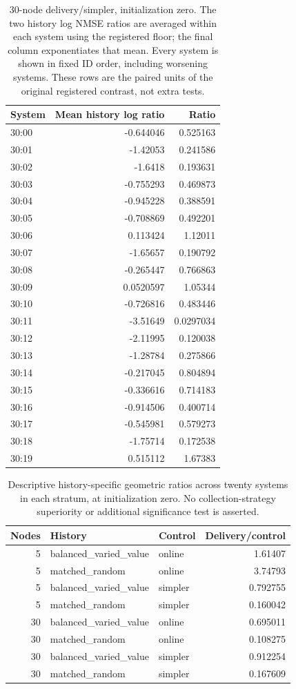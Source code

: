 \begin{table}[ht]
\centering\scriptsize
\begin{tabular}{lrr}
\toprule
System & Mean history log ratio & Ratio\\
\midrule
30:00 & -0.644046 & 0.525163\\
30:01 & -1.42053 & 0.241586\\
30:02 & -1.6418 & 0.193631\\
30:03 & -0.755293 & 0.469873\\
30:04 & -0.945228 & 0.388591\\
30:05 & -0.708869 & 0.492201\\
30:06 & 0.113424 & 1.12011\\
30:07 & -1.65657 & 0.190792\\
30:08 & -0.265447 & 0.766863\\
30:09 & 0.0520597 & 1.05344\\
30:10 & -0.726816 & 0.483446\\
30:11 & -3.51649 & 0.0297034\\
30:12 & -2.11995 & 0.120038\\
30:13 & -1.28784 & 0.275866\\
30:14 & -0.217045 & 0.804894\\
30:15 & -0.336616 & 0.714183\\
30:16 & -0.914506 & 0.400714\\
30:17 & -0.545981 & 0.579273\\
30:18 & -1.75714 & 0.172538\\
30:19 & 0.515112 & 1.67383\\
\bottomrule
\end{tabular}
\caption{30-node delivery/simpler, initialization zero. The two history log NMSE ratios are averaged within each system using the registered floor; the final column exponentiates that mean. Every system is shown in fixed ID order, including worsening systems. These rows are the paired units of the original registered contrast, not extra tests.}
\end{table}
\begin{table}[ht]
\centering\small
\begin{tabular}{rllr}
\toprule
Nodes & History & Control & Delivery/control\\
\midrule
5 & balanced\_varied\_value & online & 1.61407\\
5 & matched\_random & online & 3.74793\\
5 & balanced\_varied\_value & simpler & 0.792755\\
5 & matched\_random & simpler & 0.160042\\
30 & balanced\_varied\_value & online & 0.695011\\
30 & matched\_random & online & 0.108275\\
30 & balanced\_varied\_value & simpler & 0.912254\\
30 & matched\_random & simpler & 0.167609\\
\bottomrule
\end{tabular}
\caption{Descriptive history-specific geometric ratios across twenty systems in each stratum, at initialization zero. No collection-strategy superiority or additional significance test is asserted.}
\end{table}
